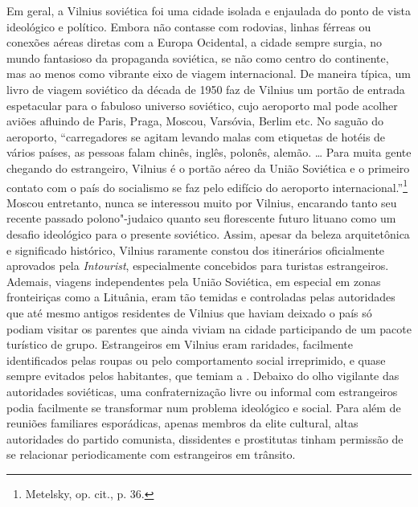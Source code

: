 Em geral, a Vilnius soviética foi uma cidade isolada e enjaulada do
ponto de vista ideológico e político. Embora não contasse com rodovias,
linhas férreas ou conexões aéreas diretas com a Europa Ocidental, a
cidade sempre surgia, no mundo fantasioso da propaganda soviética, se
não como centro do continente, mas ao menos como vibrante eixo de viagem
internacional. De maneira típica, um livro de viagem soviético da década
de 1950 faz de Vilnius um portão de entrada espetacular para o fabuloso
universo soviético, cujo aeroporto mal pode acolher aviões afluindo de
Paris, Praga, Moscou, Varsóvia, Berlim etc. No saguão do aeroporto,
``carregadores se agitam levando malas com etiquetas de hotéis de vários
países, as pessoas falam chinês, inglês, polonês, alemão. \ldots{} Para
muita gente chegando do estrangeiro, Vilnius é o portão aéreo da União
Soviética e o primeiro contato com o país do socialismo se faz pelo
edifício do aeroporto internacional.''\footnote{Metelsky, op. cit., p. 36.} Moscou entretanto, nunca se interessou muito por Vilnius, encarando tanto seu recente passado polono"-judaico quanto seu
florescente futuro lituano como um desafio ideológico para o presente
soviético. Assim, apesar da beleza arquitetônica e significado
histórico, Vilnius raramente constou dos itinerários oficialmente
aprovados pela \textit{Intourist}, especialmente concebidos para turistas
estrangeiros. Ademais, viagens independentes pela União Soviética, em
especial em zonas fronteiriças como a Lituânia, eram tão temidas e
controladas pelas autoridades que até mesmo antigos residentes de
Vilnius que haviam deixado o país só podiam visitar os parentes que
ainda viviam na cidade participando de um pacote turístico de grupo.
Estrangeiros em Vilnius eram raridades, facilmente identificados pelas
roupas ou pelo comportamento social irreprimido, e quase sempre evitados
pelos habitantes, que temiam a . Debaixo do olho vigilante das
autoridades soviéticas, uma confraternização livre ou informal com
estrangeiros podia facilmente se transformar num problema ideológico e
social. Para além de reuniões familiares esporádicas, apenas membros da
elite cultural, altas autoridades do partido comunista, dissidentes e
prostitutas tinham permissão de se relacionar periodicamente com
estrangeiros em trânsito.

